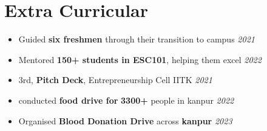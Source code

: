 \section*{\sc Extra Curricular}
\vspace{-2mm}
\hrulefill
\vspace{1mm}

\begin{itemize}
 \item Guided \textbf{six freshmen} through their transition to campus \hfill \textit{2021}
 \item Mentored \textbf{150+ students in ESC101}, helping them excel  \hfill \textit{2022}
 \item 3rd, \textbf{Pitch Deck}, Entrepreneurship Cell IITK \hfill \textit{2021}
 \item conducted \textbf{food drive for} \textbf{3300+} people in kanpur \hfill \textit{2022}
 \item Organised \textbf{Blood Donation Drive} across \textbf{kanpur}  \hfill \textit{2023}
 
\end{itemize}
